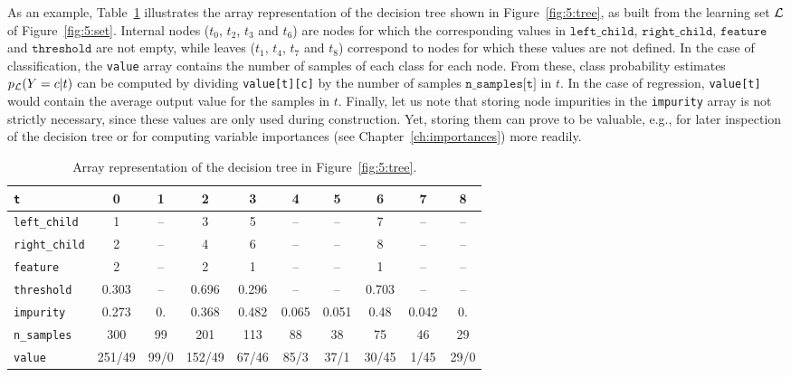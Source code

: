 As an example, Table~\ref{table:tree-array} illustrates the array
representation of the decision tree shown in Figure~\ref{fig:5:tree}, as built
from the learning set ${\cal L}$ of Figure~\ref{fig:5:set}. Internal nodes
($t_0$, $t_2$, $t_3$ and $t_6$) are nodes for which the corresponding values in
$\texttt{left\_child}$, $\texttt{right\_child}$, $\texttt{feature}$ and
$\texttt{threshold}$ are not empty, while leaves ($t_1$, $t_4$, $t_7$ and
$t_8$) correspond to nodes for which these values are not defined. In the case
of classification, the \texttt{value} array contains the number of samples of
each class for each node. From these, class probability estimates $p_{\cal
L}(Y=c|t)$ can be computed by dividing \texttt{value[t][c]} by the number of
samples $\texttt{n\_samples[t]}$ in $t$. In the case of regression,
\texttt{value[t]} would  contain the average output value for the samples in
$t$. Finally, let us note that storing node impurities in the \texttt{impurity}
array is not strictly necessary, since these values are only used during
construction. Yet, storing them can prove to be valuable, e.g., for
later inspection of the decision tree or for computing variable importances (see
Chapter~\ref{ch:importances}) more readily.

\begin{table}
    \small
    \hspace{-1.3cm}
    \begin{tabular}{| l | c c c c c c c c c |}
    \hline
    \texttt{t}    & 0 & 1 & 2 & 3 & 4 & 5 & 6 & 7 & 8 \\
    \hline
    \hline
    \texttt{left\_child} & 1 & -- & 3 & 5 & -- & -- & 7 & -- & -- \\
    \texttt{right\_child} & 2 & -- & 4 & 6 & -- & -- & 8 & -- & -- \\
    \texttt{feature} & 2 & -- & 2 & 1 & -- & -- & 1 & -- & -- \\
    \texttt{threshold} & 0.303 & -- & 0.696 & 0.296 & -- & -- & 0.703 & -- & -- \\
    \texttt{impurity} & 0.273 & 0. & 0.368 & 0.482 &  0.065 &  0.051 & 0.48  & 0.042 &  0. \\
    \texttt{n\_samples} & 300 & 99  & 201 & 113  & 88  & 38  & 75  & 46  & 29\\
    \texttt{value} & 251/49 & 99/0 & 152/49 & 67/46 & 85/3 & 37/1 & 30/45 & 1/45 & 29/0 \\
    \hline
    \end{tabular}
    \caption{Array representation of the decision tree in Figure~\ref{fig:5:tree}.}
    \label{table:tree-array}
\end{table}

